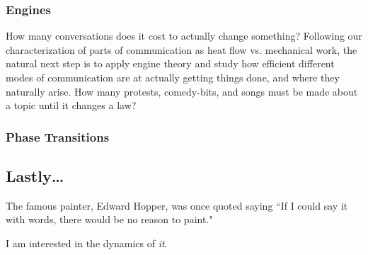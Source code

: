 \documentclass{article}
\begin{document}
\subsubsection{Engines}

How many conversations does it cost to actually change something? Following our characterization of parts of communication as heat flow vs. mechanical work, the natural next step is to apply engine theory and study how efficient different modes of communication are at actually getting things done, and where they naturally arise. How many protests, comedy-bits, and songs must be made about a topic until it changes a law?

\subsubsection{Phase Transitions}

\subsection{Lastly\dots}
The famous painter, Edward Hopper, was once quoted saying ``If I could say it with words, there would be no reason to paint." 

I am interested in the dynamics of \emph{it}.
\end{document}
